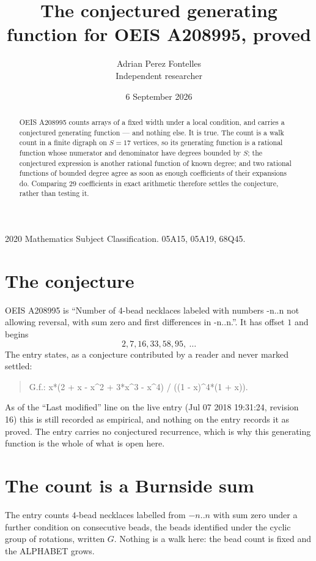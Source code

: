 \documentclass[11pt,a4paper]{article}
\title{The conjectured generating function for OEIS A208995, proved}
\author{Adrian Perez Fontelles\\ \small Independent researcher}
\date{6 September 2026}
\theoremstyle{plain}
\theoremstyle{definition}
\begin{document}
\maketitle

\begin{abstract}
OEIS A208995 counts arrays of a fixed width under a local condition, and carries a conjectured
generating function --- and nothing else. It is true. The count is a walk count in a finite
digraph on $S=17$ vertices, so its generating function is a rational function whose numerator
and denominator have degrees bounded by $S$; the conjectured expression is another rational
function of known degree; and two rational functions of bounded degree agree as soon as enough
coefficients of their expansions do. Comparing $29$ coefficients in exact arithmetic
therefore settles the conjecture, rather than testing it.
\end{abstract}

\noindent\small 2020 Mathematics Subject Classification. 05A15, 05A19, 68Q45.\normalsize

\section{The conjecture}

OEIS A208995 is ``Number of 4-bead necklaces labeled with numbers -n..n not allowing reversal, with sum zero and first differences in -n..n.''. It has offset $1$ and begins
\[
2, 7, 16, 33, 58, 95,\ \dots
\]
The entry states, as a conjecture contributed by a reader and never marked settled:
\begin{quote}
G.f.: x*(2 + x - x\^{}2 + 3*x\^{}3 - x\^{}4) / ((1 - x)\^{}4*(1 + x)).
\end{quote}
As of the ``Last modified'' line on the live entry (Jul 07 2018 19:31:24, revision 16) this is still
recorded as empirical, and nothing on the entry records it as proved. The entry carries no
conjectured recurrence, which is why this generating function is the whole of what is open
here.


\section{The count is a Burnside sum}

The entry counts $4$-bead necklaces labelled from $-n..n$ with sum zero under a further
condition on consecutive beads, the beads identified under the cyclic group of rotations, written $G$. Nothing is a
walk here: the bead count is fixed and the ALPHABET grows.
\end{document}
